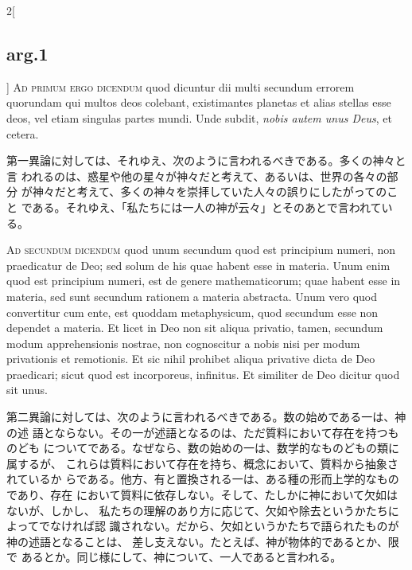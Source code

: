 \documentclass[paper=a4paper,fontsize=10pt,jafontsize=9pt,titlepage]{jlreq}
\begin{document}
\begin{paracol}{2}[\subsection{arg.1}]
{\scshape Ad primum ergo dicendum} quod dicuntur dii multi secundum errorem
quorundam qui multos deos colebant, existimantes planetas et alias
stellas esse deos, vel etiam singulas partes mundi. Unde subdit, {\itshape nobis
autem unus Deus}, et cetera.

\switchcolumn

第一異論に対しては、それゆえ、次のように言われるべきである。多くの神々と言
われるのは、惑星や他の星々が神々だと考えて、あるいは、世界の各々の部分
が神々だと考えて、多くの神々を崇拝していた人々の誤りにしたがってのこと
である。それゆえ、「私たちには一人の神が云々」とそのあとで言われている。

\switchcolumn*[\subsection{ad.2}]

{\scshape Ad secundum dicendum} quod unum secundum quod est principium
numeri, non praedicatur de Deo; sed solum de his quae habent esse in
materia. Unum enim quod est principium numeri, est de genere
mathematicorum; quae habent esse in materia, sed sunt secundum rationem
a materia abstracta. Unum vero quod convertitur cum ente, est quoddam
metaphysicum, quod secundum esse non dependet a materia. Et licet in Deo
non sit aliqua privatio, tamen, secundum modum apprehensionis nostrae,
non cognoscitur a nobis nisi per modum privationis et remotionis. Et sic
nihil prohibet aliqua privative dicta de Deo praedicari; sicut quod est
incorporeus, infinitus. Et similiter de Deo dicitur quod sit unus.

\switchcolumn

第二異論に対しては、次のように言われるべきである。数の始めである一は、神の述
語とならない。その一が述語となるのは、ただ質料において存在を持つものども
についてである。なぜなら、数の始めの一は、数学的なものどもの類に属するが、
これらは質料において存在を持ち、概念において、質料から抽象されているか
らである。他方、有と置換される一は、ある種の形而上学的なものであり、存在
において質料に依存しない。そして、たしかに神において欠如はないが、しかし、
私たちの理解のあり方に応じて、欠如や除去というかたちによってでなければ認
識されない。だから、欠如というかたちで語られたものが神の述語となることは、
差し支えない。たとえば、神が物体的であるとか、限で
あるとか。同じ様にして、神について、一人であると言われる。

\end{paracol}


\newpage
{}
\end{document}

